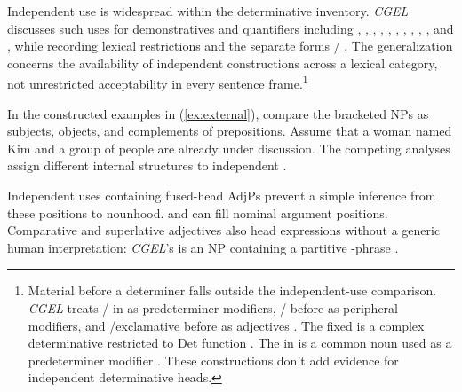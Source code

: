 \documentclass[12pt]{article}
\begin{document}
Independent use is widespread within the determinative inventory. \textit{CGEL} discusses such uses for demonstratives and quantifiers including , , , , , , , , , , and , while recording lexical restrictions and the separate forms / \citep[371--372, 410--424]{huddleston2002}. The generalization concerns the availability of independent constructions across a lexical category, not unrestricted acceptability in every sentence frame.\footnote{Material before a determiner falls outside the independent-use comparison. \textit{CGEL} treats / in  as predeterminer modifiers, / before  as peripheral modifiers, and /exclamative  before  as adjectives \citep[433--437]{huddleston2002}. The fixed  is a complex determinative restricted to Det function \citep[394]{huddleston2002}. The  in  is a common noun used as a predeterminer modifier \citep[434]{huddleston2002}. These constructions don't add evidence for independent determinative heads.}

In the constructed examples in (\ref{ex:external}), compare the bracketed NPs as subjects, objects, and complements of prepositions. Assume that a woman named Kim and a group of people are already under discussion. The competing analyses assign different internal structures to independent .

\begin{samepage}
\ea\label{ex:external}
\ea {}\qquad {}\qquad {}
\ex {}\qquad {}\qquad {}
\ex {}\qquad {}\qquad {}
\ex {}\qquad {}\qquad {}
\z\z
\end{samepage}

Independent uses containing fused-head AdjPs prevent a simple inference from these positions to nounhood.  and  can fill nominal argument positions. Comparative and superlative adjectives also head expressions without a generic human interpretation: \textit{CGEL}'s  is an NP containing a partitive -phrase \citep[332--333, 416--423]{huddleston2002}.
\end{document}
